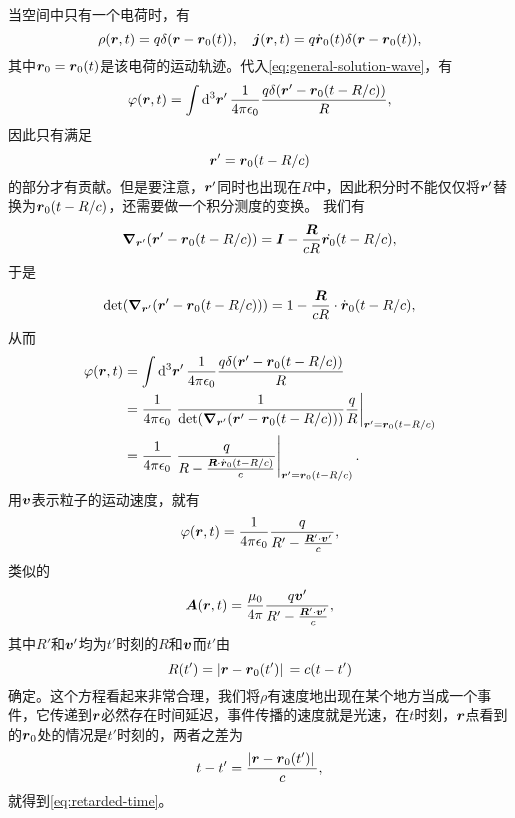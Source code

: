 当空间中只有一个电荷时，有
\[
    \rho(\vb*{r}, t) = q \delta(\vb*{r} - \vb*{r}_0(t)), \quad \vb*{j}(\vb*{r}, t) = q \dot{\vb*{r}}_0(t) \delta(\vb*{r} - \vb*{r}_0(t)),
\]
其中$\vb*{r}_0 = \vb*{r}_0(t)$是该电荷的运动轨迹。代入\eqref{eq:general-solution-wave}，有
\[
    \varphi(\vb*{r}, t) = \int \dd[3]{\vb*{r}'} \frac{1}{4\pi \epsilon_0} \frac{q \delta(\vb*{r}' - \vb*{r}_0(t - R / c))}{R},
\]
因此只有满足
\begin{equation}
    \vb*{r}' = \vb*{r}_0(t - R/c)
    \label{eq:retarded-position-original}
\end{equation}
的部分才有贡献。但是要注意，$\vb*{r}'$同时也出现在$R$中，因此积分时不能仅仅将$\vb*{r}'$替换为$\vb*{r}_0(t-R/c)$，还需要做一个积分测度的变换。
我们有
\[
    \grad_{\vb*{r}'} {(\vb*{r}' - \vb*{r}_0(t - R/c))} = \vb*{I} - \frac{\vb*{R}}{cR} \dot{\vb*{r}_0}(t-R/c) ,
\]
于是
\[
    \det(\grad_{\vb*{r}'} {(\vb*{r}' - \vb*{r}_0(t - R/c))}) = 1 - \frac{\vb*{R}}{cR} \cdot \dot{\vb*{r}}_0(t-R/c),
\]
从而
\[
    \begin{aligned}
        \varphi(\vb*{r}, t) &= \int \dd[3]{\vb*{r}'} \frac{1}{4\pi \epsilon_0} \frac{q \delta(\vb*{r}' - \vb*{r}_0(t - R / c))}{R} \\
        &= \frac{1}{4\pi \epsilon_0} \eval{\frac{1}{\det(\grad_{\vb*{r}'} {(\vb*{r}' - \vb*{r}_0(t - R/c))})} \frac{q}{R}}_{\vb*{r}' = \vb*{r}_0(t - R/c)} \\
        &= \frac{1}{4\pi \epsilon_0} \eval{\frac{q}{R - \frac{\vb*{R} \cdot \dot{\vb*{r}}_0(t-R/c)}{c}}}_{\vb*{r}' = \vb*{r}_0(t - R/c)}.
    \end{aligned}
\]
用$\vb*{v}$表示粒子的运动速度，就有
\begin{equation}
    \varphi(\vb*{r}, t) = \frac{1}{4\pi \epsilon_0} \frac{q}{R' - \frac{\vb*{R}' \cdot \vb*{v}'}{c}},
    \label{eq:retarded-phi}
\end{equation}
类似的
\begin{equation}
    \vb*{A}(\vb*{r}, t) = \frac{\mu_0}{4\pi} \frac{q \vb*{v}'}{R' - \frac{\vb*{R}' \cdot \vb*{v}'}{c}},
    \label{eq:retarded-a}
\end{equation}
其中$R'$和$\vb*{v}'$均为$t'$时刻的$R$和$\vb*{v}$而$t'$由
\begin{equation}
    R(t') = \abs*{\vb*{r} - \vb*{r}_0(t')} = c(t-t')
    \label{eq:retarded-time}
\end{equation}
确定。这个方程看起来非常合理，我们将$\rho$有速度地出现在某个地方当成一个事件，它传递到$\vb*{r}$必然存在时间延迟，事件传播的速度就是光速，在$t$时刻，$\vb*{r}$点看到的$\vb*{r}_0$处的情况是$t'$时刻的，两者之差为
\[
    t - t' = \frac{\abs*{\vb*{r} - \vb*{r}_0(t')}}{c},
\]
就得到\eqref{eq:retarded-time}。

